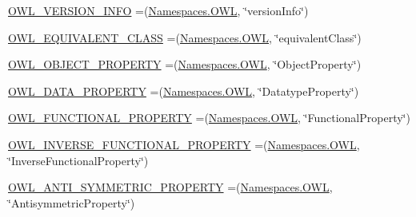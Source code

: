 \begin{DoxyCompactItemize}
\item 
\hyperlink{enumorg_1_1semanticweb_1_1owlapi_1_1vocab_1_1_o_w_l_r_d_f_vocabulary_a1cc7c9d25cdc54eaf5b85c36d68a4f41}{O\-W\-L\-\_\-\-V\-E\-R\-S\-I\-O\-N\-\_\-\-I\-N\-F\-O} =(\hyperlink{enumorg_1_1semanticweb_1_1owlapi_1_1vocab_1_1_namespaces_a2fcb537074d9307ef1356ffb6a5bd6f4}{Namespaces.\-O\-W\-L}, \char`\"{}version\-Info\char`\"{})
\item 
\hyperlink{enumorg_1_1semanticweb_1_1owlapi_1_1vocab_1_1_o_w_l_r_d_f_vocabulary_a75c5532c69e6fc16a795487738cc8a5c}{O\-W\-L\-\_\-\-E\-Q\-U\-I\-V\-A\-L\-E\-N\-T\-\_\-\-C\-L\-A\-S\-S} =(\hyperlink{enumorg_1_1semanticweb_1_1owlapi_1_1vocab_1_1_namespaces_a2fcb537074d9307ef1356ffb6a5bd6f4}{Namespaces.\-O\-W\-L}, \char`\"{}equivalent\-Class\char`\"{})
\item 
\hyperlink{enumorg_1_1semanticweb_1_1owlapi_1_1vocab_1_1_o_w_l_r_d_f_vocabulary_a2ee89d760ccaad51956508564d2471be}{O\-W\-L\-\_\-\-O\-B\-J\-E\-C\-T\-\_\-\-P\-R\-O\-P\-E\-R\-T\-Y} =(\hyperlink{enumorg_1_1semanticweb_1_1owlapi_1_1vocab_1_1_namespaces_a2fcb537074d9307ef1356ffb6a5bd6f4}{Namespaces.\-O\-W\-L}, \char`\"{}Object\-Property\char`\"{})
\item 
\hyperlink{enumorg_1_1semanticweb_1_1owlapi_1_1vocab_1_1_o_w_l_r_d_f_vocabulary_a20f703ae6757ad28ea66eac7ba8317ee}{O\-W\-L\-\_\-\-D\-A\-T\-A\-\_\-\-P\-R\-O\-P\-E\-R\-T\-Y} =(\hyperlink{enumorg_1_1semanticweb_1_1owlapi_1_1vocab_1_1_namespaces_a2fcb537074d9307ef1356ffb6a5bd6f4}{Namespaces.\-O\-W\-L}, \char`\"{}Datatype\-Property\char`\"{})
\item 
\hyperlink{enumorg_1_1semanticweb_1_1owlapi_1_1vocab_1_1_o_w_l_r_d_f_vocabulary_a5d54709a5778ec1a33bdc471283b7ca5}{O\-W\-L\-\_\-\-F\-U\-N\-C\-T\-I\-O\-N\-A\-L\-\_\-\-P\-R\-O\-P\-E\-R\-T\-Y} =(\hyperlink{enumorg_1_1semanticweb_1_1owlapi_1_1vocab_1_1_namespaces_a2fcb537074d9307ef1356ffb6a5bd6f4}{Namespaces.\-O\-W\-L}, \char`\"{}Functional\-Property\char`\"{})
\item 
\hyperlink{enumorg_1_1semanticweb_1_1owlapi_1_1vocab_1_1_o_w_l_r_d_f_vocabulary_aac1591302df57e6a2105214ffcf52322}{O\-W\-L\-\_\-\-I\-N\-V\-E\-R\-S\-E\-\_\-\-F\-U\-N\-C\-T\-I\-O\-N\-A\-L\-\_\-\-P\-R\-O\-P\-E\-R\-T\-Y} =(\hyperlink{enumorg_1_1semanticweb_1_1owlapi_1_1vocab_1_1_namespaces_a2fcb537074d9307ef1356ffb6a5bd6f4}{Namespaces.\-O\-W\-L}, \char`\"{}Inverse\-Functional\-Property\char`\"{})
\item 
\hyperlink{enumorg_1_1semanticweb_1_1owlapi_1_1vocab_1_1_o_w_l_r_d_f_vocabulary_acbc4021e14b337d877604ba4aaf29681}{O\-W\-L\-\_\-\-A\-N\-T\-I\-\_\-\-S\-Y\-M\-M\-E\-T\-R\-I\-C\-\_\-\-P\-R\-O\-P\-E\-R\-T\-Y} =(\hyperlink{enumorg_1_1semanticweb_1_1owlapi_1_1vocab_1_1_namespaces_a2fcb537074d9307ef1356ffb6a5bd6f4}{Namespaces.\-O\-W\-L}, \char`\"{}Antisymmetric\-Property\char`\"{})

\end{DoxyCompactItemize}
